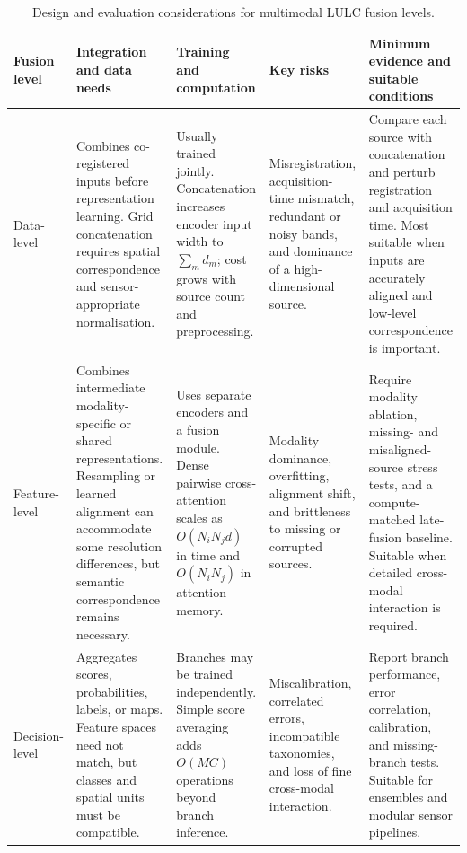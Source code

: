 \documentclass[]{interact}
\theoremstyle{plain}%
\theoremstyle{definition}
\theoremstyle{remark}
\begin{document}
\begin{table}[!htbp]
	\centering
	\caption{Design and evaluation considerations for multimodal LULC fusion levels.}
	\label{tab:fusion_levels}
	\footnotesize
	\setlength{\tabcolsep}{2pt}
	\renewcommand{\arraystretch}{1.18}
	\begin{tabular}{@{} >{\raggedright\arraybackslash}p{1.25cm} >{\raggedright\arraybackslash}p{2.90cm} >{\raggedright\arraybackslash}p{3.00cm} >{\raggedright\arraybackslash}p{2.65cm} >{\raggedright\arraybackslash}p{3.65cm} @{}}
		\toprule
		\textbf{Fusion level} & \textbf{Integration and data needs} & \textbf{Training and computation} & \textbf{Key risks} & \textbf{Minimum evidence and suitable conditions} \\
		\midrule
		Data-level & Combines co-registered inputs before representation learning. Grid concatenation requires spatial correspondence and sensor-appropriate normalisation. & Usually trained jointly. Concatenation increases encoder input width to $\sum_m d_m$; cost grows with source count and preprocessing. & Misregistration, acquisition-time mismatch, redundant or noisy bands, and dominance of a high-dimensional source. & Compare each source with concatenation and perturb registration and acquisition time. Most suitable when inputs are accurately aligned and low-level correspondence is important. \\
		\addlinespace[2pt]
		Feature-level & Combines intermediate modality-specific or shared representations. Resampling or learned alignment can accommodate some resolution differences, but semantic correspondence remains necessary. & Uses separate encoders and a fusion module. Dense pairwise cross-attention scales as $O(N_iN_jd)$ in time and $O(N_iN_j)$ in attention memory. & Modality dominance, overfitting, alignment shift, and brittleness to missing or corrupted sources. & Require modality ablation, missing- and misaligned-source stress tests, and a compute-matched late-fusion baseline. Suitable when detailed cross-modal interaction is required. \\
		\addlinespace[2pt]
		Decision-level & Aggregates scores, probabilities, labels, or maps. Feature spaces need not match, but classes and spatial units must be compatible. & Branches may be trained independently. Simple score averaging adds $O(MC)$ operations beyond branch inference. & Miscalibration, correlated errors, incompatible taxonomies, and loss of fine cross-modal interaction. & Report branch performance, error correlation, calibration, and missing-branch tests. Suitable for ensembles and modular sensor pipelines. \\

\end{tabular}
\end{table}
\end{document}
